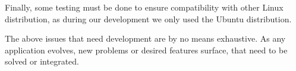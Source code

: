 \par Finally, some testing must be done to ensure compatibility with other Linux distribution, as during our development we only used the Ubuntu distribution.

\par The above issues that need development are by no means exhaustive. As any application evolves, new problems or desired features surface, that need to be solved or integrated. 



